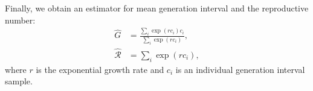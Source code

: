 \documentclass[12pt]{article}
\newcommand{\RR}{\ensuremath{{\mathcal R}}}
\begin{document}
Finally, we obtain an estimator for mean generation interval and the reproductive number:
\begin{equation}
\begin{aligned}
\hat{G} &= \frac{\sum_{i} \exp(r c_i) c_i}{\sum_{i} \exp(r c_i)},\\
\hat{\RR} &= \sum_{i} \exp(r c_i),
\end{aligned}
\end{equation}
where $r$ is the exponential growth rate and $c_i$ is an individual generation interval sample.


\end{document}
